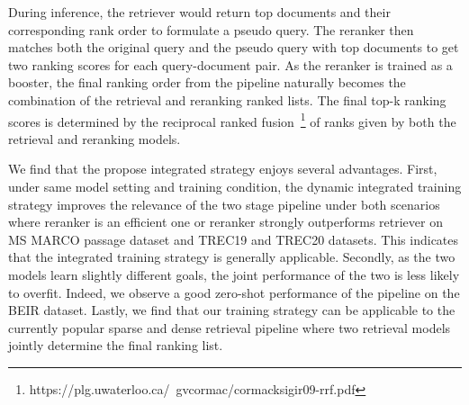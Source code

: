 {During inference, the retriever would return top documents and their corresponding rank order to formulate a pseudo query. The reranker then matches both the original query and the pseudo query with top documents to get two ranking scores for each query-document pair. As the reranker is trained as a booster, the final ranking order from the pipeline naturally becomes the combination of the retrieval and reranking ranked lists. The final top-k ranking scores is determined by the reciprocal ranked fusion~\footnote{https://plg.uwaterloo.ca/~gvcormac/cormacksigir09-rrf.pdf} of ranks given by both the retrieval and reranking models.

We find that the propose integrated strategy enjoys several advantages. First, under same model setting and training condition, the dynamic integrated training strategy improves the relevance of the two stage pipeline under both scenarios where reranker is an efficient one or reranker strongly outperforms retriever on MS MARCO passage dataset and TREC19 and TREC20 datasets. This indicates that the integrated training strategy is generally applicable.  Secondly, as the two models learn slightly different goals, the joint performance of the two is less likely to overfit. Indeed, we observe a good zero-shot performance of the pipeline on the BEIR dataset. Lastly, we find that our training strategy can be applicable to the currently popular sparse and dense retrieval pipeline where two retrieval models jointly determine the final ranking list. 

}
